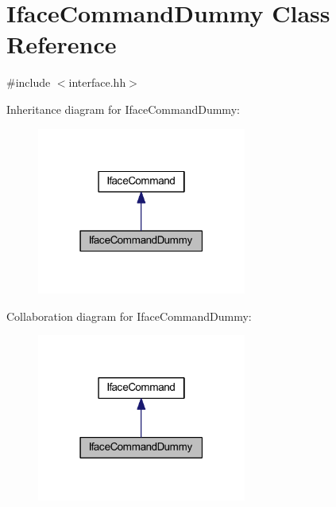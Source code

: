 \hypertarget{class_iface_command_dummy}{}\section{Iface\+Command\+Dummy Class Reference}
\label{class_iface_command_dummy}


{\ttfamily \#include $<$interface.\+hh$>$}



Inheritance diagram for Iface\+Command\+Dummy\+:
\nopagebreak
\begin{figure}[H]
\begin{center}
\leavevmode
\includegraphics[width=195pt]{class_iface_command_dummy__inherit__graph}
\end{center}
\end{figure}


Collaboration diagram for Iface\+Command\+Dummy\+:
\nopagebreak
\begin{figure}[H]
\begin{center}
\leavevmode
\includegraphics[width=195pt]{class_iface_command_dummy__coll__graph}
\end{center}
\end{figure}
